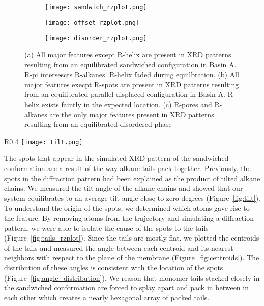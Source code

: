 \begin{figure}
	\centering
	\begin{subfigure}{0.31\textwidth}
		\centering
		\hspace{-0.9cm}
		\texttt{[image: sandwich\_rzplot.png]}
		\caption{}\label{fig:sandwich_rzplot}
	\end{subfigure}
	\begin{subfigure}{0.31\textwidth}
		\centering
		\hspace{-0.9cm}
		\texttt{[image: offset\_rzplot.png]}
		\caption{}\label{fig:offsetrzplot}
	\end{subfigure}
	\begin{subfigure}{0.31\textwidth}
		\centering
		\hspace{-0.9cm}
		\texttt{[image: disorder\_rzplot.png]}
		\caption{}\label{fig:disorder_rzplot.png}
	\end{subfigure}
	\caption{(a) All major features except R-helix are present in
	XRD patterns resulting from an equilibrated sandwiched configuration 
	in Basin A. R-pi intersescts R-alkanes. R-helix faded during equilbration.
	(b) All major features execpt R-spots are present in XRD patterns 
	resulting from an equilibrated parallel displaced configuration in Basin A.
	R-helix exists faintly in the expected location. (c) R-pores and R-alkanes
	are the only major features present in XRD patterns resulting from an 
	equilibrated disordered phase}\label{fig:XRDsim}
\end{figure}

\begin{wrapfigure}{R}{0.4\textwidth}
        \centering
        \texttt{[image: tilt.png]}
        \caption{The average angle between alkane chains and the xy plane is nearly zero degrees}\label{fig:tilt}
\end{wrapfigure}


The spots that appear in the simulated XRD pattern of the sandwiched
conformation are a result of the way alkane tails pack together. Previously,
the spots in the diffraction pattern had been explained as the product of
tilted alkane chains. We measured the tilt angle of the alkane chains and 
showed that our system equilibrates to an average tilt angle close to zero 
degrees (Figure~\ref{fig:tilt}). To understand the origin of the spots, we 
determined which atoms gave rise to the feature. By removing atoms from 
the trajectory and simulating a diffraction pattern, we were able to isolate
the cause of the spots to the tails (Figure~\ref{fig:tails_rzplot}). Since the tails are mostly flat, we
plotted the centroids of the tails and measured the angle between each centroid 
and its nearest neighbors with respect to the plane of the membrane (Figure~\ref{fig:centroids}). The 
distribution of these angles is consistent with the location of the spots (Figure~\ref{fig:angle_distribution}).
We reason that monomer tails stacked closely in the sandwiched conformation
are forced to splay apart and pack in between in each other which creates a
nearly hexagonal array of packed tails. 

